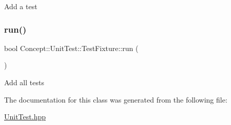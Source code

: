 Add a test \mbox{\label{class_concept_1_1_unit_test_1_1_test_fixture_a6191716d38524a4acbc287a4b22ba25a}} 
\subsubsection{\texorpdfstring{run()}{run()}}
{\footnotesize\ttfamily bool Concept\+::\+Unit\+Test\+::\+Test\+Fixture\+::run (\begin{DoxyParamCaption}{ }\end{DoxyParamCaption})\hspace{0.3cm}{\ttfamily [inline]}}

Add all tests 

The documentation for this class was generated from the following file\+:\begin{DoxyCompactItemize}
\item 
\mbox{\hyperlink{_unit_test_8hpp}{Unit\+Test.\+hpp}}\end{DoxyCompactItemize}
